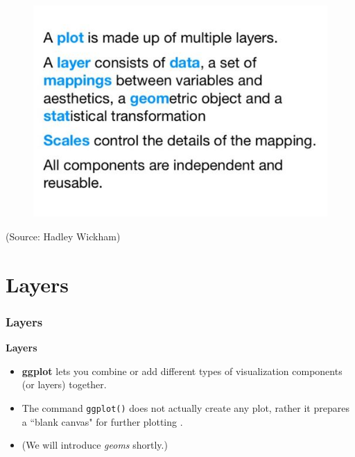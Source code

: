 \documentclass{beamer}
\begin{document}
\begin{frame}[fragile]
	\begin{figure}
		\centering
		\includegraphics[width=1.1\linewidth]{ggplot2-info}
	\end{figure}
	(Source: Hadley Wickham)
\end{frame}

\section{Layers}
\begin{frame}[fragile]
	\frametitle{Layers}
	\Large
	\noindent \textbf{Layers}
	\begin{itemize}
		\item \textbf{ggplot} lets you combine or add different types of visualization components (or layers) together. 
		\item The command \texttt{ggplot()} does not actually create any plot, rather it prepares a ``blank canvas" for further plotting .
		\item (We will introduce \textit{geoms} shortly.)
	\end{itemize}
	
\end{frame}
\end{document}
